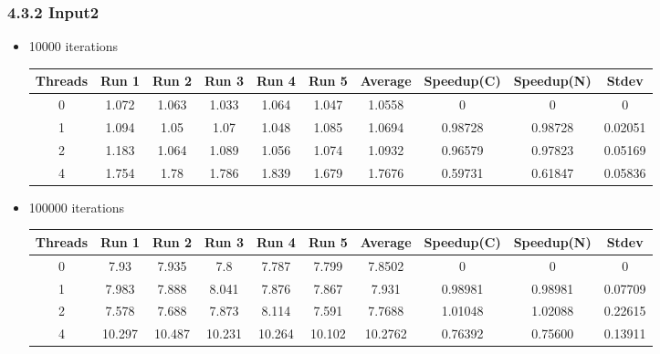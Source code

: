 \subsubsection*{4.3.2 Input2} 
 \begin{itemize}
\item 10000 iterations
\begin{center}
 \begin{adjustbox}{width=\columnwidth, center} 
 \begin{tabular}{ | |c | c c c c c | c | c c | c | |} \hline 
 Threads & Run 1 & Run 2 & Run 3 & Run 4 & Run 5 & Average & Speedup(C) & Speedup(N) & Stdev \\ [0.5ex] 
 \hline 
 \hline 
0& 1.072 & 1.063 & 1.033 & 1.064 & 1.047 & 1.0558 & 0 & 0 & 0\\ 
 \hline
1& 1.094 & 1.05 & 1.07 & 1.048 & 1.085 & 1.0694 & 0.98728 & 0.98728 & 0.02051\\ 
 \hline
2& 1.183 & 1.064 & 1.089 & 1.056 & 1.074 & 1.0932 & 0.96579 & 0.97823 & 0.05169\\ 
 \hline
4& 1.754 & 1.78 & 1.786 & 1.839 & 1.679 & 1.7676 & 0.59731 & 0.61847 & 0.05836\\ 
 \hline
\end{tabular} 
 \end{adjustbox} 
 \end{center} 
\item 100000 iterations
\begin{center}
 \begin{adjustbox}{width=\columnwidth, center} 
 \begin{tabular}{ | |c | c c c c c | c | c c | c | |} \hline 
 Threads & Run 1 & Run 2 & Run 3 & Run 4 & Run 5 & Average & Speedup(C) & Speedup(N) & Stdev \\ [0.5ex] 
 \hline 
 \hline 
0& 7.93 & 7.935 & 7.8 & 7.787 & 7.799 & 7.8502 & 0 & 0 & 0\\ 
 \hline
1& 7.983 & 7.888 & 8.041 & 7.876 & 7.867 & 7.931 & 0.98981 & 0.98981 & 0.07709\\ 
 \hline
2& 7.578 & 7.688 & 7.873 & 8.114 & 7.591 & 7.7688 & 1.01048 & 1.02088 & 0.22615\\ 
 \hline
4& 10.297 & 10.487 & 10.231 & 10.264 & 10.102 & 10.2762 & 0.76392 & 0.75600 & 0.13911\\ 
 \hline
\end{tabular} 
 \end{adjustbox} 
 \end{center} 
\end{itemize}
